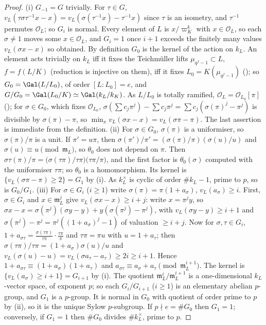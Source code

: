\begin{proof}
(i) $G_{-1}=G$ trivially. For $\tau\in G$, $v_L(\tau\sigma\tau^{-1}x-x)=v_L(\sigma(\tau^{-1}x)-\tau^{-1}x)$ since $\tau$ is an isometry, and $\tau^{-1}$ permutes $\mathcal O_L$;
so $G_i$ is normal. Every element of $L$ is $x/\varpi_K^k$ with $x\in\mathcal O_L$, so each $\sigma\ne1$ moves some $x\in\mathcal O_L$, and $G_i=1$ once $i+1$
exceeds the finitely many values $v_L(\sigma x-x)$ so obtained. By definition $G_0$ is the kernel of the action on $k_L$. An element acts trivially on
$k_L$ iff it fixes the Teichm\"uller lifts $\mu_{q^{f}-1}\subset L$, $f=f(L/K)$ (reduction is injective on them), iff it fixes $L_0=K(\mu_{q^f-1})$
(); so $G_0=\Gal(L/L_0)$, of order $[L:L_0]=e$, and $G/G_0=\Gal(L_0/K)\simeq\Gal(k_L/k_K)$. As $L/L_0$ is totally ramified,
$\mathcal O_L=\mathcal O_{L_0}[\pi]$ (); for $\sigma\in G_0$, which fixes $\mathcal O_{L_0}$, $\sigma(\sum c_j\pi^j)-\sum c_j\pi^j=\sum c_j(\sigma(\pi)^j-\pi^j)$ is
divisible by $\sigma(\pi)-\pi$, so $\min_xv_L(\sigma x-x)=v_L(\sigma\pi-\pi)$. The last assertion is immediate from the definition.
(ii) For $\sigma\in G_0$, $\sigma(\pi)$ is a uniformiser, so $\sigma(\pi)/\pi$ is a unit. If $\pi'=u\pi$, then $\sigma(\pi')/\pi'=(\sigma(\pi)/\pi)(\sigma(u)/u)$ and
$\sigma(u)\equiv u\pmod{\mathfrak m_L}$, so $\theta_0$ does not depend on $\pi$. Then $\sigma\tau(\pi)/\pi=\bigl(\sigma(\tau\pi)/\tau\pi\bigr)\bigl(\tau\pi/\pi\bigr)$, and the first
factor is $\theta_0(\sigma)$ computed with the uniformiser $\tau\pi$; so $\theta_0$ is a homomorphism. Its kernel is $\{v_L(\sigma\pi-\pi)\ge2\}=G_1$ by (i). As $k_L^\times$ is
cyclic of order $\#k_L-1$, prime to $p$, so is $G_0/G_1$.
(iii) For $\sigma\in G_i$ ($i\ge1$) write $\sigma(\pi)=\pi(1+a_\sigma)$, $v_L(a_\sigma)\ge i$. First, $\sigma\in G_i$ and $x\in\mathfrak m_L^j$ give $v_L(\sigma x-x)\ge i+j$: write $x=\pi^jy$, so
$\sigma x-x=\sigma(\pi^j)(\sigma y-y)+y(\sigma(\pi^j)-\pi^j)$, with $v_L(\sigma y-y)\ge i+1$ and $\sigma(\pi^j)-\pi^j=\pi^j((1+a_\sigma)^j-1)$ of valuation $\ge i+j$. Now for
$\sigma,\tau\in G_i$, $1+a_{\sigma\tau}=\frac{\sigma(\tau\pi)}{\tau\pi}\cdot\frac{\tau\pi}{\pi}$ and $\tau\pi=\pi u$ with $u=1+a_\tau$; then $\sigma(\tau\pi)/\tau\pi=(1+a_\sigma)\sigma(u)/u$ and
$v_L(\sigma(u)-u)=v_L(\sigma a_\tau-a_\tau)\ge2i\ge i+1$. Hence $1+a_{\sigma\tau}\equiv(1+a_\sigma)(1+a_\tau)$ and $a_{\sigma\tau}\equiv a_\sigma+a_\tau\pmod{\mathfrak m_L^{i+1}}$. The kernel is
$\{v_L(a_\sigma)\ge i+1\}=G_{i+1}$ by (i). The quotient $\mathfrak m_L^i/\mathfrak m_L^{i+1}$ is a one-dimensional $k_L$-vector space, of exponent $p$; so each
$G_i/G_{i+1}$ ($i\ge1$) is an elementary abelian $p$-group, and $G_1$ is a $p$-group. It is normal in $G_0$ with quotient of order prime to $p$ by
(ii), so it is the unique Sylow $p$-subgroup. If $p\nmid e=\#G_0$ then $G_1=1$; conversely, if $G_1=1$ then $\#G_0$ divides $\#k_L^\times$, prime to
$p$.
\end{proof}

